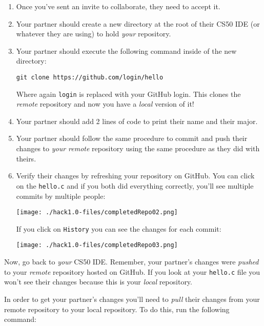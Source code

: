 \documentclass[12pt]{scrartcl}
\begin{document}
\begin{enumerate}
  \item Once you've sent an invite to collaborate, they need to 
  accept it.
  \item Your partner should create a new directory at the root of
  their CS50 IDE (or whatever they are using) to hold \emph{your}
  repository.
  \item Your partner should execute the following command inside
  of the new directory:
  
  \texttt{git clone https://github.com/login/hello}
  
  Where again \texttt{login} is replaced with your
  GitHub login.  This clones the \emph{remote} repository and now you have a 
  \emph{local} version of it!

  \item Your partner should add 2 lines of code to 
  print their name and their major.
  
  \item Your partner should follow the same procedure to commit 
  and push their changes to \emph{your remote} repository using 
  the same procedure as they did with theirs.
  
  \item Verify their changes by refreshing your repository on
  GitHub.  You can click on the \texttt{hello.c} and if 
  you both did everything correctly, you'll see multiple commits 
  by multiple people:
  \begin{center}
  \texttt{[image: ./hack1.0-files/completedRepo02.png]}
  \end{center}
  If you click on \texttt{History} you can see the changes for
  each commit: 
  \begin{center}
  \texttt{[image: ./hack1.0-files/completedRepo03.png]}
  \end{center}

\end{enumerate}

Now, go back to \emph{your} CS50 IDE.  Remember, your partner's
changes were \emph{pushed} to your \emph{remote} repository hosted
on GitHub.  If you look at your \texttt{hello.c} file
you won't see their changes because this is your \emph{local}
repository.  

In order to get your partner's changes you'll need to \emph{pull}
their changes from your remote repository to your local repository.
To do this, run the following command:
\end{document}
